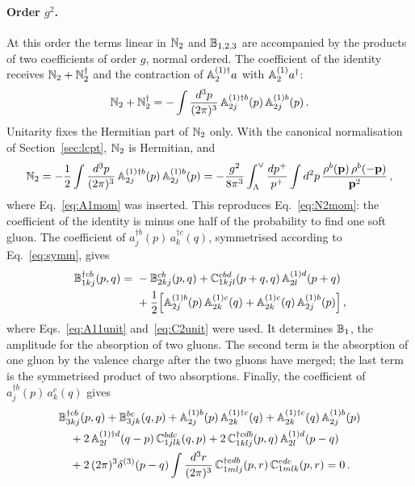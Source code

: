\paragraph{Order $g^2$.} At this order the terms linear in $\mathbb{N}_2$ and $\mathbb{B}_{1,2,3}$ are accompanied by the products of two coefficients of order $g$, normal ordered. The coefficient of the identity receives $\mathbb{N}_2+\mathbb{N}_2^\dagger$ and the contraction of $\mathbb{A}^{(1)\dagger}_2a$ with $\mathbb{A}^{(1)}_2a^\dagger$:
\begin{align}\label{eq:Nunit}
\mathbb{N}_2+\mathbb{N}_2^\dagger=-\int\frac{d^3p}{(2\pi)^3}\,\mathbb{A}^{(1)\dagger b}_{2j}(p)\,\mathbb{A}^{(1)b}_{2j}(p)\,.
\end{align}
Unitarity fixes the Hermitian part of $\mathbb{N}_2$ only. With the canonical normalisation of Section~\ref{sec:lcpt}, $\mathbb{N}_2$ is Hermitian, and
\begin{align}\label{eq:N2unit}
\mathbb{N}_2=-\frac12\int\frac{d^3p}{(2\pi)^3}\,\mathbb{A}^{(1)\dagger b}_{2j}(p)\,\mathbb{A}^{(1)b}_{2j}(p)
=-\frac{g^2}{8\pi^3}\int_\Lambda^\vee\frac{dp^+}{p^+}\int d^2p\,\frac{\rho^b(\mathbf{p})\,\rho^b(-\mathbf{p})}{\mathbf{p}^2}\,,
\end{align}
where Eq.~\eqref{eq:A1mom} was inserted. This reproduces Eq.~\eqref{eq:N2mom}: the coefficient of the identity is minus one half of the probability to find one soft gluon. The coefficient of $a^{\dagger b}_j(p)\,a^{\dagger c}_k(q)$, symmetrised according to Eq.~\eqref{eq:symm}, gives
\begin{align}\label{eq:B1unit}
\mathbb{B}^{\dagger cb}_{1kj}(p,q)=\ &-\mathbb{B}^{cb}_{2kj}(p,q)+\mathbb{C}^{cbd}_{1kjl}(p+q,q)\,\mathbb{A}^{(1)d}_{2l}(p+q)\notag\\
&+\frac12\Big[\mathbb{A}^{(1)b}_{2j}(p)\,\mathbb{A}^{(1)c}_{2k}(q)+\mathbb{A}^{(1)c}_{2k}(q)\,\mathbb{A}^{(1)b}_{2j}(p)\Big]\,,
\end{align}
where Eqs.~\eqref{eq:A11unit} and~\eqref{eq:C2unit} were used. It determines $\mathbb{B}_1$, the amplitude for the absorption of two gluons. The second term is the absorption of one gluon by the valence charge after the two gluons have merged; the last term is the symmetrised product of two absorptions. Finally, the coefficient of $a^{\dagger b}_j(p)\,a^c_k(q)$ gives
\begin{align}\label{eq:B3unit}
&\mathbb{B}^{\dagger cb}_{3kj}(p,q)+\mathbb{B}^{bc}_{3jk}(q,p)+\mathbb{A}^{(1)b}_{2j}(p)\,\mathbb{A}^{(1)\dagger c}_{2k}(q)+\mathbb{A}^{(1)\dagger c}_{2k}(q)\,\mathbb{A}^{(1)b}_{2j}(p)\notag\\
&\quad+2\,\mathbb{A}^{(1)\dagger d}_{2l}(q-p)\,\mathbb{C}^{bdc}_{1jlk}(q,p)+2\,\mathbb{C}^{\dagger cdb}_{1klj}(p,q)\,\mathbb{A}^{(1)d}_{2l}(p-q)\notag\\
&\quad+2\,(2\pi)^3\delta^{(3)}(p-q)\int\frac{d^3r}{(2\pi)^3}\,\mathbb{C}^{\dagger edb}_{1mlj}(p,r)\,\mathbb{C}^{edc}_{1mlk}(p,r)=0\,.
\end{align}
